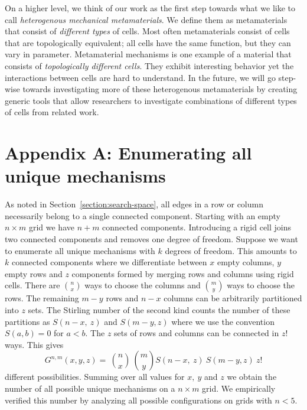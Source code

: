 On a higher level, we think of our work as the first step towards what we like to call \textit{heterogenous mechanical metamaterials}. We define them as metamaterials that consist of \textit{different types} of cells. Most often metamaterials consist of cells that are topologically equivalent; all cells have the same function, but they can vary in parameter. Metamaterial mechanisms is one example of a material that consists of \textit{topologically different cells}. They exhibit interesting behavior yet the interactions between cells are hard to understand. In the future, we will go step-wise towards investigating more of these heterogenous metamaterials by creating generic tools that allow researchers to investigate combinations of different types of cells from related work. 


\pagebreak

\section{Appendix A: Enumerating all unique mechanisms}
\label{appendix:unique-mechanisms}

As noted in Section~\ref{section:search-space}, all edges in a row or column necessarily belong to a single connected component. Starting with an empty $n \times m$ grid we have $n+m$ connected components. Introducing a rigid cell joins two connected components and removes one degree of freedom. Suppose we want to enumerate all unique mechanisms with $k$ degrees of freedom. This amounts to $k$ connected components where we differentiate between $x$ empty columns, $y$ empty rows and $z$ components formed by merging rows and columns using rigid cells. There are $\binom{n}{x}$ ways to choose the columns and $\binom{m}{y}$ ways to choose the rows. The remaining $m-y$ rows and $n-x$ columns can be arbitrarily partitioned into $z$ sets. The Stirling number of the second kind counts the number of these partitions as $S(n-x,\ z)$ and $S(m-y,z)$ where we use the convention $S\left(a,b\right)=0$ for $a<b$. The $z$ sets of rows and columns can be connected in $z!$ ways. This gives 
$$G^{n,m}\left(x,y,z\right)=\ \binom{n}{x}\ \binom{m}{y}S\left(n-x,\ z\right)\ S\left(m-y,z\right)\ z!$$
different possibilities. Summing over all values for $x,\ y$ and $z$ we obtain the number of all possible unique mechanisms on a $n \times m$ grid. We empirically verified this number by analyzing all possible configurations on grids with $n<5$.

\pagebreak

